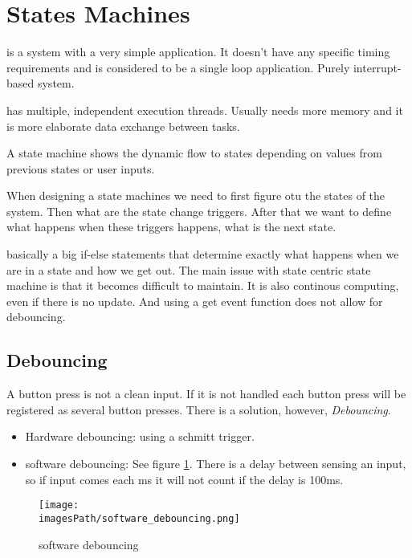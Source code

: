 

\section{States Machines}
 is a system with a very simple application.
It doesn't have any specific timing requirements and is considered
to be a single loop application. Purely interrupt-based system.

 has multiple, independent execution threads. Usually
needs more memory and it is more elaborate data exchange between tasks.

 A state machine shows the dynamic flow to states depending on values from previous states or user inputs.

When designing a state machines we need to first figure otu the 
states of the system. Then what are the state change triggers.
After that we want to define what happens when these triggers happens,
what is the next state.

 basically a big if-else statements 
that determine exactly what happens when we are in a state and how we get out.
The main issue with state centric state machine is that it becomes difficult to maintain. 
It is also continous computing, even if there is no update.
And using a get event function does not allow for debouncing.

\subsection{Debouncing}
A button press is not a clean input. If it is not handled each button press will be registered as several button presses.
There is a solution, however, \textit{Debouncing}.
\begin{itemize}
    \item Hardware debouncing: using a schmitt trigger.
    \item software debouncing: See figure \ref{fig:software_debouncing}. There is a delay between sensing an input, so if input comes each ms it will not count if the delay is 100ms.
\end{itemize}

\begin{figure}[H]
    \centering
    \texttt{[image: \\imagesPath/software\_debouncing.png]}
    \caption{software debouncing}
    \label{fig:software_debouncing}
\end{figure}


